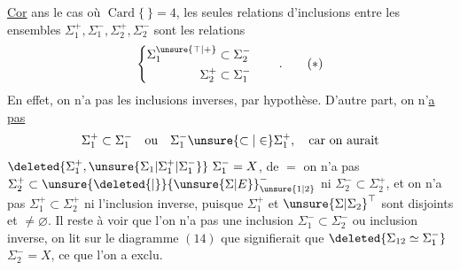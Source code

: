 \endgroup
\clearpage

\begingroup\makeatletter\tagsleft@true\makeatother
\uline{Cor} ans le cas où $\operatorname{Card}\{\ \}=4$,  les seules relations d'inclusions entre les ensembles $\Sigma_1^+,\Sigma_1^-,\Sigma_2^+,\Sigma_2^-$ sont les relations
\[
\left\{\begin{aligned}
\Sigma_1^{\unsure{\top|+}}&\subset\Sigma_2^-\\
\Sigma_2^+&\subset\Sigma_1^-
\end{aligned}\right.\qquad .
\tag*{($*$)}
\]
En effet, on n'a pas les inclusions inverses, par hypothèse. D'autre part, on n'\uline{a pas}
\[
\Sigma_1^+\subset\Sigma_1^-\quad\text{ou}\quad
\Sigma_1^-\unsure{\subset|\in}\Sigma_1^+,\quad\text{car on aurait}
\]
$\deleted{\Sigma_1^+,\unsure{\Sigma_1|\Sigma_1^+|\Sigma_1^-}}\ \Sigma_1^-=X$, de $=$ on n'a pas $\Sigma_2^+\subset\unsure{\deleted{\vert}}{\unsure{\Sigma|E}}_{\unsure{1|2}}^-$ ni $\Sigma_2^-\subset\Sigma_2^+$, et on n'a pas $\Sigma_1^+\subset\Sigma_2^+$ ni l'inclusion inverse, puisque $\Sigma_1^+$ et $\unsure{\Sigma|\Sigma_2}^{\top}$ sont disjoints et $\ne\varnothing$. Il reste à voir que l'on n'a pas une inclusion $\Sigma_1^-\subset\Sigma_2^-$ ou inclusion inverse, on lit sur le diagramme $(14)$ que   signifierait que $\deleted{\Sigma_{12}\simeq\Sigma_1^-}$  $\Sigma_2^-=X$, ce que l'on a exclu.

